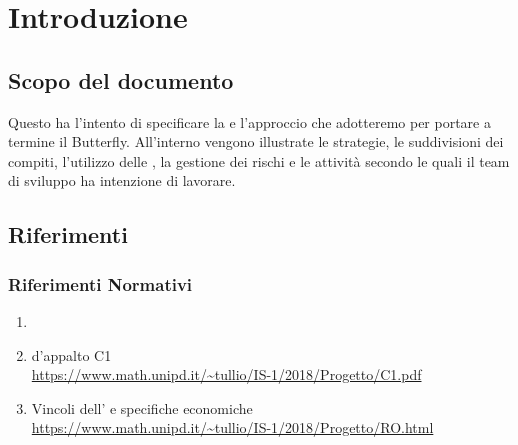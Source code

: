 \newpage
\section{Introduzione} \label{Introduzione}

	

	\subsection{Scopo del documento}
	Questo  ha l'intento di specificare la  e l'approccio che adotteremo per portare a termine il  Butterfly.
	All'interno vengono illustrate le strategie, le suddivisioni dei compiti, l'utilizzo delle , la gestione dei rischi e le attività secondo le quali
	il team di sviluppo ha intenzione di lavorare.

    

	\subsection{Riferimenti}
		\subsubsection{Riferimenti Normativi}\label{rifnorma}
			\begin{enumerate}
				\item \NdPd
				\item {} d'appalto C1\\
				\url{https://www.math.unipd.it/~tullio/IS-1/2018/Progetto/C1.pdf}
				\item Vincoli dell' e specifiche economiche\\
				\url{https://www.math.unipd.it/~tullio/IS-1/2018/Progetto/RO.html}
			\end{enumerate}

